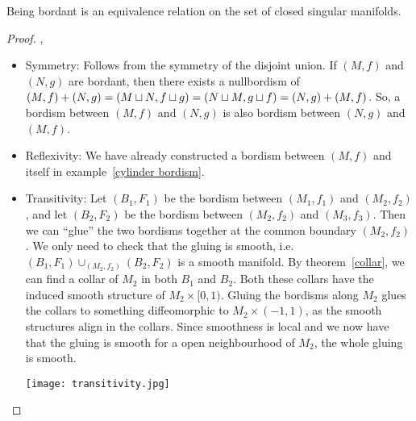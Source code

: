 \documentclass[a4paper,12pt]{article}
\begin{document}
\begin{proposition}\cite[II, Satz 1.4]{brocker}\label{equivalence bordant}
    Being bordant is an equivalence relation on the set of closed singular manifolds.
\end{proposition}

\begin{proof}\cite{brocker},\ \cite[p.8]{conner}
    \begin{itemize}
        \item Symmetry: 
        Follows from the symmetry of the disjoint union. 
        If \((M,f)\) and \((N,g)\) are bordant, then there exists a nullbordism of \((M,f)+(N,g)=(M\sqcup N, f\sqcup g) = (N\sqcup M, g\sqcup f) = (N,g)+ (M,f)\). 
        So, a bordism between \((M,f)\) and \((N,g)\) is also bordism between \((N,g)\) and \((M,f)\).

        \item Reflexivity: 
        We have already constructed a bordism between \((M,f)\) and itself in example\ \ref{cylinder bordism}.

        \item Transitivity: 
        Let \((B_1,F_1)\) be the bordism between \((M_1,f_1)\) and \((M_2,f_2)\), and let \((B_2,F_2)\) be the bordism between \((M_2,f_2)\) and \((M_3,f_3)\). Then we can \enquote{glue} the two bordisms together at the common boundary \((M_2,f_2)\). 
        We only need to check that the gluing is smooth, i.e.\ \((B_1,F_1)\cup_{(M_2,f_2)}(B_2,F_2)\) is a smooth manifold. 
        By theorem\ \ref{collar}, we can find a collar of \(M_2\) in both \(B_1\) and \(B_2\). 
        Both these collars have the induced smooth structure of \(M_2\times [0,1)\). 
        Gluing the bordisms along \(M_2\) glues the collars to something diffeomorphic to \(M_2\times (-1,1)\), as the smooth structures align in the collars. 
        Since smoothness is local and we now have that the gluing is smooth for a open neighbourhood of \(M_2\), the whole gluing is smooth.
        \begin{center}
            \texttt{[image: transitivity.jpg]}
        \end{center}
    \end{itemize}
\end{proof}
\end{document}
